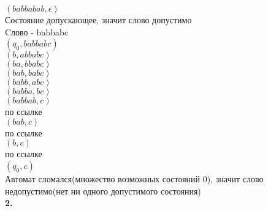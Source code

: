 \documentclass[a4paper,12pt]{article}
\begin{document}
$(babbabab,\epsilon)$\\Состояние допускающее, значит слово допустимо\\
Cлово - babbabc\\
$(q_0,babbabc)$\\
$(b,abbabc)$\\
$(ba,bbabc)$\\
$(bab,babc)$\\
$(babb,abc)$\\
$(babba,bc)$\\
$(babbab,c)$\\
по ссылке\\
$(bab,c)$\\
по ссылке\\
$(b,c)$\\
по ссылке\\
$(q_0,c)$\\
Автомат сломался(множество возможных состояний 0), значит слово недопустимо(нет ни одного допустимого состояния)\\
\textbf{2.}\\
\end{document}
